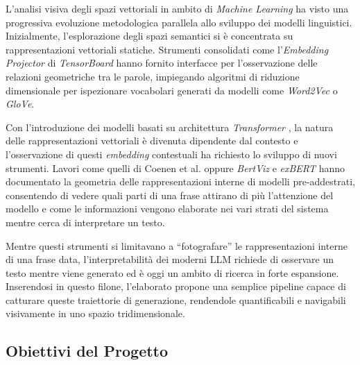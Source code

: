 L'analisi visiva degli spazi vettoriali in ambito di \textit{Machine Learning} ha visto una progressiva evoluzione metodologica parallela allo sviluppo dei modelli linguistici. Inizialmente, l'esplorazione degli spazi semantici si è concentrata su rappresentazioni vettoriali statiche. Strumenti consolidati come l'\textit{Embedding Projector} di \textit{TensorBoard} \cite{smilkov2016embedding} hanno fornito interfacce per l'osservazione delle relazioni geometriche tra le parole, impiegando algoritmi di riduzione dimensionale per ispezionare vocabolari generati da modelli come \textit{Word2Vec} o \textit{GloVe}.

Con l'introduzione dei modelli basati su architettura \textit{Transformer} \cite{vaswani2017attention}, la natura delle rappresentazioni vettoriali è divenuta dipendente dal contesto e l'osservazione di questi \textit{embedding} contestuali ha richiesto lo sviluppo di nuovi strumenti. Lavori come quelli di Coenen et al. \cite{coenen2019pair} oppure \textit{BertViz} e \textit{exBERT} \cite{hoover2019exbert} hanno documentato la geometria delle rappresentazioni interne di modelli pre-addestrati, consentendo di vedere quali parti di una frase attirano di più l'attenzione del modello e come le informazioni vengono elaborate nei vari strati del sistema mentre cerca di interpretare un testo.

Mentre questi strumenti si limitavano a ``fotografare'' le rappresentazioni interne di una frase data, l'interpretabilità dei moderni LLM richiede di osservare un testo mentre viene generato ed è oggi un ambito di ricerca in forte espansione. Inserendosi in questo filone, l'elaborato propone una semplice pipeline capace di catturare queste traiettorie di generazione, rendendole quantificabili e navigabili visivamente in uno spazio tridimensionale.

\subsection{Obiettivi del Progetto}
\label{sec:obiettivi_progetto}

